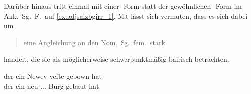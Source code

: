 Darüber hinaus tritt einmal   mit einer -Form
statt der gewöhnlichen -Form im Akk.\ Sg.\ F.\ auf
\cref{ex:adjsalzbgirr_1}. Mit \citet{ksw2} lässt sich vermuten, dass es sich
dabei um \blockcquote[270]{ksw2}{\mbox{eine} Angleichung an den
Nom.~Sg.~fem.~stark} handelt, die sie als möglicherweise schwerpunktmäßig
bairisch betrachten.

\begin{exe}
	\ex \label{ex:adjsalzbgirr_1}
		\gll der ein Newev veſte gebown hat \\
			der ein neu-\Acc.\Sg.\FemI.\St{} Burg gebaut hat \\
		\begin{taggedline}{\parencites(Salzburg, um 1285)[\pno~695, 103.11]{cao2}}
		\trans {}
		\end{taggedline}

\end{exe}


